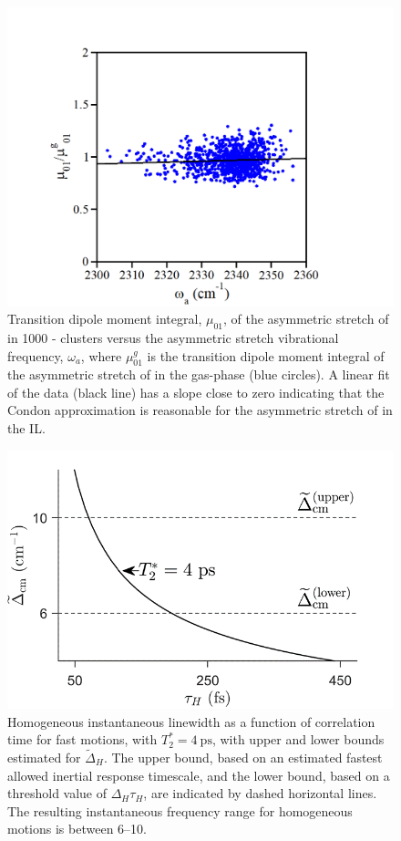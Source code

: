 \begin{figure}[h]
  \centering
  \includegraphics{paper_03/figure3.png}
  \caption{Transition dipole moment integral, \(\mu_{01}\), of the asymmetric stretch of  in 1000 -\ce{[C4C1im][PF6]} clusters versus the asymmetric stretch vibrational frequency, \(\omega_{a}\), where \(\mu_{01}^{g}\) is the transition dipole moment integral of the asymmetric stretch of  in the gas-phase (blue circles). A linear fit of the data (black line) has a slope close to zero indicating that the Condon approximation is reasonable for the asymmetric stretch of  in the \ce{[C4C1im][PF6]} IL.}
  \label{paper_03:fig3}
\end{figure}

\begin{figure}[h]
  \centering
  \includegraphics{paper_03/figure4.png}
  \caption[Linewidth dependence on correlation time for fast motions]{Homogeneous instantaneous linewidth as a function of correlation time for fast motions, with \(T_{2}^{*} = \SI{4}{\pico\second}\), with upper and lower bounds estimated for \({\widetilde{\Delta}}_{H}\). The upper bound, based on an estimated fastest allowed inertial response timescale, and the lower bound, based on a threshold value of \(\Delta_{H}\tau_{H}\), are indicated by dashed horizontal lines. The resulting instantaneous frequency range for homogeneous motions is between \SIrange{6}{10}{\wavenumber}.}
  \label{paper_03:fig4}
\end{figure}


